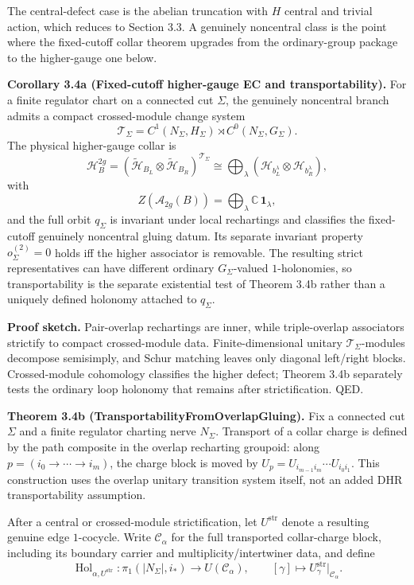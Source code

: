 The central-defect case is the abelian truncation with \(H\) central and trivial action, which reduces to Section 3.3. A genuinely noncentral class is the point where the fixed-cutoff collar theorem upgrades from the ordinary-group package to the higher-gauge one below.

\textbf{Corollary 3.4a (Fixed-cutoff higher-gauge EC and transportability).} For a finite regulator chart on a connected cut \(\Sigma\), the genuinely noncentral branch admits a compact crossed-module change system
\[
\mathcal T_\Sigma
=
C^1(N_\Sigma,H_\Sigma)\rtimes C^0(N_\Sigma,G_\Sigma).
\]
The physical higher-gauge collar is
\[
\mathcal H_B^{2g}
=
(\widetilde{\mathcal H}_{B_L}\otimes \widetilde{\mathcal H}_{B_R})^{\mathcal T_\Sigma}
\cong
\bigoplus_\lambda
(\mathcal H_{b_L^\lambda}\otimes \mathcal H_{b_R^\lambda}),
\]
with
\[
Z(\mathcal A_{2g}(B))
=
\bigoplus_\lambda \mathbb C\,\mathbf 1_\lambda,
\]
and the full orbit \(q_\Sigma\) is invariant under local rechartings and classifies the fixed-cutoff
genuinely noncentral gluing datum. Its separate invariant property \(o^{(2)}_\Sigma=0\) holds iff
the higher associator is removable. The resulting strict representatives can have different
ordinary \(G_\Sigma\)-valued \(1\)-holonomies, so transportability is the separate existential test
of Theorem 3.4b rather than a uniquely defined holonomy attached to \(q_\Sigma\).

\textbf{Proof sketch.} Pair-overlap rechartings are inner, while triple-overlap associators strictify to compact crossed-module data. Finite-dimensional unitary \(\mathcal T_\Sigma\)-modules decompose semisimply, and Schur matching leaves only diagonal left/right blocks. Crossed-module cohomology classifies the higher defect; Theorem 3.4b separately tests the ordinary loop holonomy that remains after strictification. QED.

\textbf{Theorem 3.4b (TransportabilityFromOverlapGluing).} Fix a connected cut \(\Sigma\) and a finite regulator charting nerve \(N_\Sigma\). Transport of a collar charge is defined by the path composite in the overlap recharting groupoid: along \(p=(i_0\to\cdots\to i_m)\), the charge block is moved by \(U_p=U_{i_{m-1}i_m}\cdots U_{i_0i_1}\). This construction uses the overlap unitary transition system itself, not an added DHR transportability assumption.

After a central or crossed-module strictification, let \(U^{\mathrm{str}}\) denote a resulting
genuine edge \(1\)-cocycle. Write \(\mathcal C_\alpha\) for the full transported collar-charge block,
including its boundary carrier and multiplicity/intertwiner data, and define
\[
\operatorname{Hol}_{\alpha,U^{\mathrm{str}}}:\pi_1(|N_\Sigma|,i_*)\longrightarrow U(\mathcal C_\alpha),
\qquad
[\gamma]\longmapsto U^{\mathrm{str}}_\gamma\big|_{\mathcal C_\alpha}.
\]

